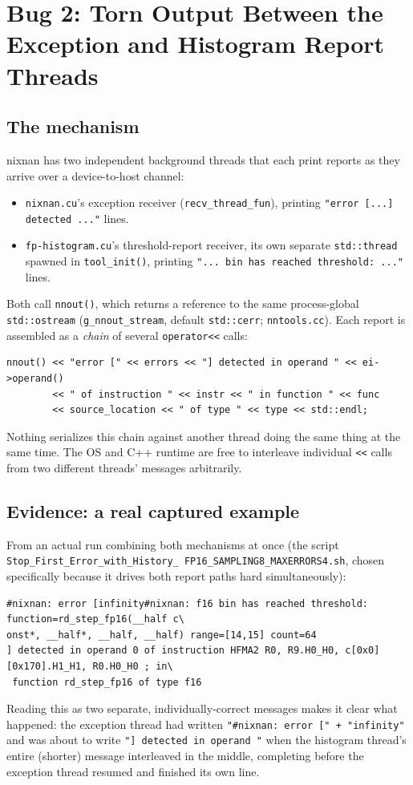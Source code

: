 \documentclass[11pt]{article}
\begin{document}
\section{Bug 2: Torn Output Between the Exception and Histogram Report Threads}
\label{sec:stdout-tearing}

\subsection{The mechanism}

nixnan has two independent background threads that each print reports as they arrive
over a device-to-host channel:
\begin{itemize}
\item \texttt{nixnan.cu}'s exception receiver (\texttt{recv\_thread\_fun}), printing
  \texttt{"error [...] detected ..."} lines.
\item \texttt{fp-histogram.cu}'s threshold-report receiver, its own separate
  \texttt{std::thread} spawned in \texttt{tool\_init()}, printing
  \texttt{"... bin has reached threshold: ..."} lines.
\end{itemize}
Both call \texttt{nnout()}, which returns a reference to the same process-global
\texttt{std::ostream} (\texttt{g\_nnout\_stream}, default \texttt{std::cerr}; \texttt{nntools.cc}).
Each report is assembled as a \emph{chain} of several \texttt{operator<<} calls:
\begin{lstlisting}
nnout() << "error [" << errors << "] detected in operand " << ei->operand()
        << " of instruction " << instr << " in function " << func
        << source_location << " of type " << type << std::endl;
\end{lstlisting}
Nothing serializes this chain against another thread doing the same thing at the same
time. The OS and C++ runtime are free to interleave individual \texttt{<<} calls from
two different threads' messages arbitrarily.

\subsection{Evidence: a real captured example}

From an actual run combining both mechanisms at once (the script
\texttt{Stop\_First\_Error\_\allowbreak with\_History\_\allowbreak
FP16\_\allowbreak SAMPLING8\_\allowbreak MAXERRORS4.sh}, chosen specifically
because it drives both report paths hard simultaneously):
\begin{lstlisting}[basicstyle=\ttfamily\scriptsize]
#nixnan: error [infinity#nixnan: f16 bin has reached threshold: function=rd_step_fp16(__half c\
onst*, __half*, __half, __half) range=[14,15] count=64
] detected in operand 0 of instruction HFMA2 R0, R9.H0_H0, c[0x0] [0x170].H1_H1, R0.H0_H0 ; in\
 function rd_step_fp16 of type f16
\end{lstlisting}
Reading this as two separate, individually-correct messages makes it clear what
happened: the exception thread had written \texttt{"\#nixnan: error [" + "infinity"} and
was about to write \texttt{"] detected in operand "} when the histogram thread's entire
(shorter) message interleaved in the middle, completing before the exception thread
resumed and finished its own line.
\end{document}
